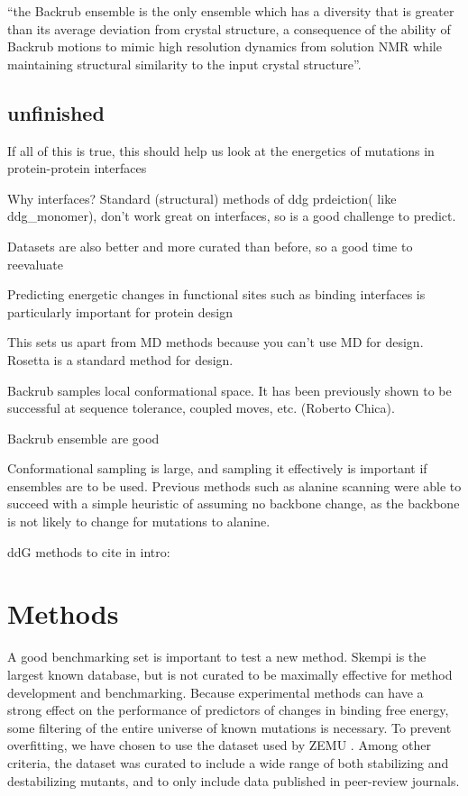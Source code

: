 ``the Backrub ensemble is the only ensemble which has a diversity that is greater than its average deviation from crystal structure, a consequence of the ability of Backrub motions to mimic high resolution dynamics from solution NMR while maintaining structural similarity to the input crystal structure''.\cite{davey_improving_2014}

\subsection{unfinished}
If all of this is true, this should help us look at the energetics of mutations in protein-protein interfaces

Why interfaces? Standard (structural) methods of ddg prdeiction( like ddg\_monomer), don't work great on interfaces, so is a good challenge to predict.

Datasets are also better and more curated than before, so a good time to reevaluate

Predicting energetic changes in functional sites such as binding interfaces is particularly important for protein design

This sets us apart from MD methods because you can't use MD for design. Rosetta is a standard method for design.

Backrub samples local conformational space.
It has been previously shown to be successful at sequence tolerance, coupled moves, etc. (Roberto Chica).

Backrub ensemble are good \cite{schenkelberg_protein_2016}

Conformational sampling is large, and sampling it effectively is important if ensembles are to be used. Previous methods such as alanine scanning were able to succeed with a simple heuristic of assuming no backbone change, as the backbone is not likely to change for mutations to alanine.

ddG methods to cite in intro:\cite{vangone_contacts-based_2015}

\section{Methods}

A good benchmarking set is important to test a new method. Skempi \cite{moal_skempi:_2012} is the largest known database, but is not curated to be maximally effective for method development and benchmarking. Because experimental methods can have a strong effect on the performance of predictors of changes in binding free energy\cite{geng_exploring_2016}, some filtering of the entire universe of known mutations is necessary. To prevent overfitting, we have chosen to use the dataset used by ZEMU \cite{dourado_multiscale_2014}. Among other criteria, the dataset was curated to include a wide range of both stabilizing and destabilizing mutants, and to only include data published in peer-review journals.

